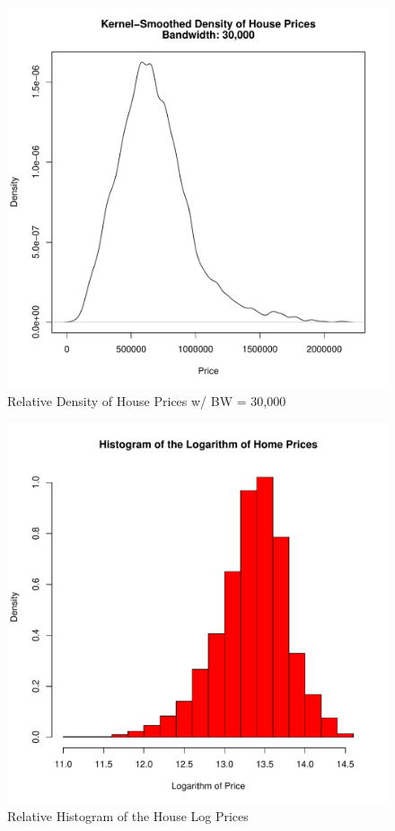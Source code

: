 \begin{figure}[h!]
  \centering
  \includegraphics[scale = 0.5, keepaspectratio=true]{../Figures/density_Price_bw30000}
  \caption{Relative Density of House Prices w/ BW = 30,000} \label{fig:density_Price_bw30000}
\end{figure}
%
%
\begin{figure}[h!]
  \centering
  \includegraphics[scale = 0.5, keepaspectratio=true]{../Figures/hist_log_price}
  \caption{Relative Histogram of the House Log Prices} \label{fig:hist_log_price}
\end{figure}
